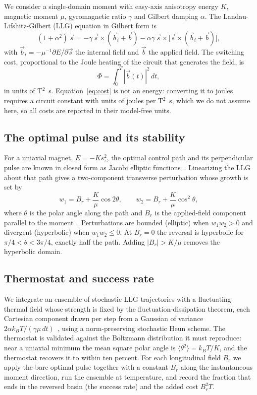 \documentclass[11pt]{article}
\begin{document}
We consider a single-domain moment with easy-axis anisotropy energy $K$, magnetic moment $\mu$,
gyromagnetic ratio $\gamma$ and Gilbert damping $\alpha$. The Landau-Lifshitz-Gilbert (LLG) equation in
Gilbert form is
\begin{equation}
(1+\alpha^2)\,\dot{\vec s} = -\gamma\,\vec s \times (\vec b_i + \vec b)
-\alpha\gamma\,\vec s \times \bigl[\vec s \times (\vec b_i + \vec b)\bigr],
\end{equation}
with $\vec b_i = -\mu^{-1}\partial E/\partial \vec s$ the internal field and $\vec b$ the applied
field. The switching cost, proportional to the Joule heating of the circuit that generates the field,
is
\begin{equation}
\Phi = \int_0^T |\vec b(t)|^2\, dt,
\label{eq:cost}
\end{equation}
in units of T$^2$~s. Equation~\eqref{eq:cost} is not an energy: converting it to joules requires a
circuit constant with units of joules per T$^2$~s, which we do not assume here, so all costs are
reported in their model-free units.

\subsection{The optimal pulse and its stability}

For a uniaxial magnet, $E = -K s_z^2$, the optimal control path and its perpendicular pulse are known
in closed form as Jacobi elliptic functions~\citep{kwiatkowski2021}. Linearizing the LLG about that
path gives a two-component transverse perturbation whose growth is set by
\begin{equation}
w_1 = B_r + \frac{K}{\mu}\cos 2\theta, \qquad
w_2 = B_r + \frac{K}{\mu}\cos^2\theta,
\end{equation}
where $\theta$ is the polar angle along the path and $B_r$ is the applied-field component parallel to
the moment~\citep{badarneh2023stability}. Perturbations are bounded (elliptic) when $w_1 w_2 > 0$ and
divergent (hyperbolic) when $w_1 w_2 \le 0$. At $B_r = 0$ the reversal is hyperbolic for
$\pi/4 < \theta < 3\pi/4$, exactly half the path. Adding $|B_r| > K/\mu$ removes the hyperbolic domain.

\subsection{Thermostat and success rate}

We integrate an ensemble of stochastic LLG trajectories with a fluctuating thermal field whose
strength is fixed by the fluctuation-dissipation theorem, each Cartesian component drawn per step from
a Gaussian of variance $2\alpha k_B T/(\gamma\mu\,dt)$~\citep{evans2014}, using a norm-preserving
stochastic Heun scheme. The thermostat is validated against the Boltzmann distribution it must
reproduce: near a uniaxial minimum the mean square polar angle is $\langle\theta^2\rangle = k_B T/K$,
and the thermostat recovers it to within ten percent. For each longitudinal field $B_r$ we apply the
bare optimal pulse together with a constant $B_r$ along the instantaneous moment direction, run the
ensemble at temperature, and record the fraction that ends in the reversed basin (the success rate) and
the added cost $B_r^2 T$.
\end{document}
